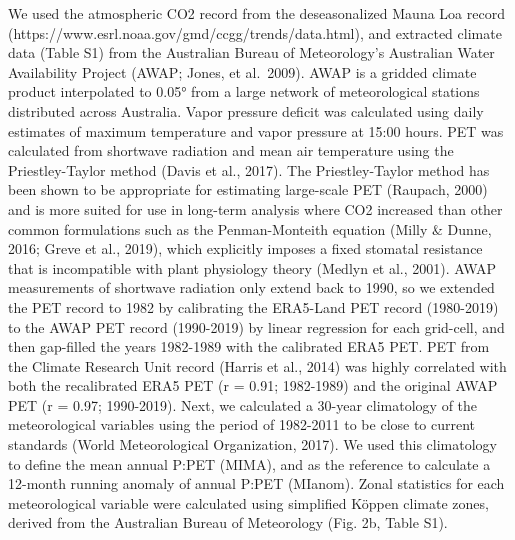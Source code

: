 \documentclass[gc, manuscript]{copernicus}
\begin{document}
We used the atmospheric CO2 record from the deseasonalized Mauna Loa
record (https://www.esrl.noaa.gov/gmd/ccgg/trends/data.html), and
extracted climate data (Table S1) from the Australian Bureau of
Meteorology's Australian Water Availability Project (AWAP; Jones, et
al.~2009). AWAP is a gridded climate product interpolated to 0.05° from
a large network of meteorological stations distributed across Australia.
Vapor pressure deficit was calculated using daily estimates of maximum
temperature and vapor pressure at 15:00 hours. PET was calculated from
shortwave radiation and mean air temperature using the Priestley-Taylor
method (Davis et al., 2017). The Priestley-Taylor method has been shown
to be appropriate for estimating large-scale PET (Raupach, 2000) and is
more suited for use in long-term analysis where CO2 increased than other
common formulations such as the Penman-Monteith equation (Milly \&
Dunne, 2016; Greve et al., 2019), which explicitly imposes a fixed
stomatal resistance that is incompatible with plant physiology theory
(Medlyn et al., 2001). AWAP measurements of shortwave radiation only
extend back to 1990, so we extended the PET record to 1982 by
calibrating the ERA5-Land PET record (1980-2019) to the AWAP PET record
(1990-2019) by linear regression for each grid-cell, and then gap-filled
the years 1982-1989 with the calibrated ERA5 PET. PET from the Climate
Research Unit record (Harris et al., 2014) was highly correlated with
both the recalibrated ERA5 PET (r = 0.91; 1982-1989) and the original
AWAP PET (r = 0.97; 1990-2019). Next, we calculated a 30-year
climatology of the meteorological variables using the period of
1982-2011 to be close to current standards (World Meteorological
Organization, 2017). We used this climatology to define the mean annual
P:PET (MIMA), and as the reference to calculate a 12-month running
anomaly of annual P:PET (MIanom). Zonal statistics for each
meteorological variable were calculated using simplified Köppen climate
zones, derived from the Australian Bureau of Meteorology (Fig. 2b, Table
S1).
\end{document}
